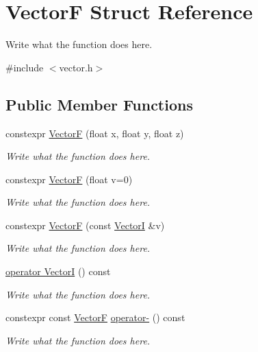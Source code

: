 \hypertarget{structVectorF}{\section{Vector\+F Struct Reference}
\label{structVectorF}
}


Write what the function does here.  




{\ttfamily \#include $<$vector.\+h$>$}

\subsection*{Public Member Functions}
\begin{DoxyCompactItemize}
\item 
constexpr \hyperlink{structVectorF_a0f4de0211dcec74e2cf31c3dbc8f6573}{Vector\+F} (float x, float y, float z)
\begin{DoxyCompactList}\small\item\em Write what the function does here. \end{DoxyCompactList}\item 
constexpr \hyperlink{structVectorF_a5bc6c2141ab8c3b26c3b15c3d2188e46}{Vector\+F} (float v=0)
\begin{DoxyCompactList}\small\item\em Write what the function does here. \end{DoxyCompactList}\item 
constexpr \hyperlink{structVectorF_aa06b752b0c00710c1d6d0c885686b282}{Vector\+F} (const \hyperlink{structVectorI}{Vector\+I} \&v)
\begin{DoxyCompactList}\small\item\em Write what the function does here. \end{DoxyCompactList}\item 
\hyperlink{structVectorF_a62bcc8b79ffdf1e6e1199d46ed800d78}{operator Vector\+I} () const 
\begin{DoxyCompactList}\small\item\em Write what the function does here. \end{DoxyCompactList}\item 
constexpr const \hyperlink{structVectorF}{Vector\+F} \hyperlink{structVectorF_a797fe54dd83c9a90bf538afdc60c8a31}{operator-\/} () const 
\begin{DoxyCompactList}\small\item\em Write what the function does here. \end{DoxyCompactList}\item 

\end{DoxyCompactItemize}
